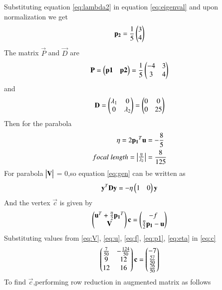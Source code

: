 \documentclass[journal,12pt,twocolumn]{IEEEtran}
\begin{document}
Substituting equation \eqref{eq:lambda2} in equation \eqref{eq:eigenval} and upon normalization we get
\begin{align}
    \mathbf{p_2} = \frac{1}{5}\begin{pmatrix}3\\4\end{pmatrix}
\end{align}
The matrix $\vec{P}$ and $\vec{D}$ are
\begin{align}
    \mathbf{P} = \begin{pmatrix}\mathbf{p1}&\mathbf{p2}\end{pmatrix}=\frac{1}{5}\begin{pmatrix}-4&3\\3&4\end{pmatrix}
\end{align}
and
\begin{align}
    \mathbf{D} = \begin{pmatrix}\lambda_1&0\\0&\lambda_2\end{pmatrix} = \begin{pmatrix}0&0\\0&25\end{pmatrix}
\end{align}
Then for the parabola
\begin{align}
    \eta = 2\mathbf{p_1}^T\mathbf{u}&=-\frac{8}{5}\label{eq:eta}\\
    focal\;length =\begin{vmatrix}\frac{\eta}{\lambda_2}\end{vmatrix}&=\frac{8}{125}
\end{align}
For parabola $\begin{vmatrix}\mathbf{V}\end{vmatrix}$ = 0,so equation \eqref{eq:gen} can be written as
\begin{align}
    \mathbf{y}^T\mathbf{D}\mathbf{y}=-\eta\begin{pmatrix}1&0\end{pmatrix}\mathbf{y}
\end{align}
And the vertex $\vec{c}$ is given by
\begin{align}
    \begin{pmatrix}\mathbf{u}^T+\frac{\eta}{2}\mathbf{p_1}^T\\\mathbf{V}\end{pmatrix}\mathbf{c}=\begin{pmatrix}-f\\\frac{\eta}{2}\mathbf{p_1}-\mathbf{u}\end{pmatrix}\label{eq:c}
\end{align}
Substituting values from \eqref{eq:V}, \eqref{eq:u}, \eqref{eq:f}, \eqref{eq:p1}, \eqref{eq:eta} in \eqref{eq:c}
\begin{align}
    \begin{pmatrix}\frac{7}{50}&-\frac{124}{50}\\9&12\\12&16\end{pmatrix}\mathbf{c}=\begin{pmatrix}-7\\\frac{57}{50}\\\frac{76}{50}\end{pmatrix}
\end{align}
To find $\vec{c}$,performing row reduction in augmented matrix as follows
\end{document}
